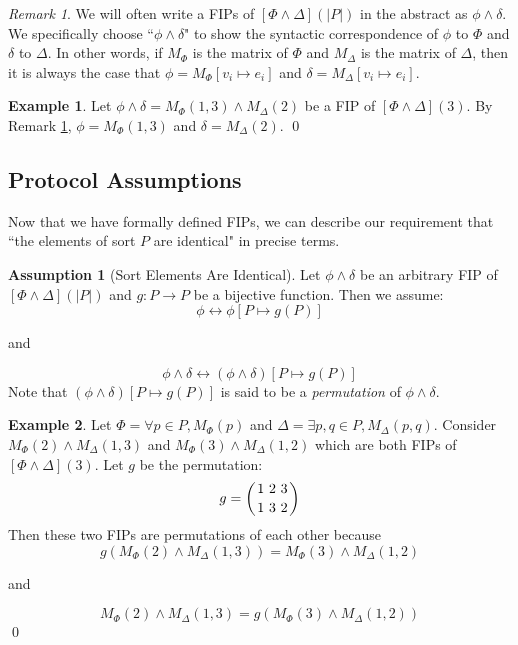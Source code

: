 \documentclass[12pt]{article}
\theoremstyle{definition}
\newtheorem{assumption}{Assumption}
\newtheorem{example}{Example}
\theoremstyle{remark}
\newtheorem{remark}{Remark}
\newcommand{\msp}{\text{ }}
\newcommand{\perm}{\genfrac{}{}{0pt}{}}
\begin{document}
\begin{remark}
  \label{rmk:fip-syntax}
  We will often write a FIPs of $[\Phi\land\Delta](|P|)$ in the abstract as $\phi\land\delta$.  We specifically choose ``$\phi\land\delta$" to show the syntactic correspondence of $\phi$ to $\Phi$ and $\delta$ to $\Delta$.  In other words, if $M_{\Phi}$ is the matrix of $\Phi$ and $M_{\Delta}$ is the matrix of $\Delta$, then it is always the case that $\phi = M_{\Phi}[v_i \mapsto e_i]$ and $\delta = M_{\Delta}[v_i \mapsto e_i]$.
\end{remark}

\begin{example}
  Let $\phi\land\delta = M_{\Phi}(1,3) \land M_{\Delta}(2)$ be a FIP of $[\Phi\land\Delta](3)$.  By Remark \ref{rmk:fip-syntax}, $\phi = M_{\Phi}(1,3)$ and $\delta = M_{\Delta}(2)$.
  \qed
\end{example}


\subsection{Protocol Assumptions}

Now that we have formally defined FIPs, we can describe our requirement that ``the elements of sort $P$ are identical" in precise terms.

\begin{assumption}[Sort Elements Are Identical]
  \label{asmp:perm}
  Let $\phi\land\delta$ be an arbitrary FIP of $[\Phi\land\Delta](|P|)$ and $g : P \to P$ be a bijective function.  Then we assume:
  $$\phi \leftrightarrow \phi[P \mapsto g(P)]$$
  \begin{center}
    and
  \end{center}
  $$\phi\land\delta \leftrightarrow (\phi\land\delta)[P \mapsto g(P)]$$
  Note that $(\phi\land\delta)[P \mapsto g(P)]$ is said to be a \textit{permutation} of $\phi\land\delta$.
\end{assumption}

\begin{example}
  Let $\Phi = \forall p \in P, M_{\Phi}(p)$ and $\Delta = \exists p,q \in P, M_{\Delta}(p,q)$.  Consider $M_{\Phi}(2) \land M_{\Delta}(1,3)$ and $M_{\Phi}(3) \land M_{\Delta}(1,2)$ which are both FIPs of $[\Phi\land\Delta](3)$.  Let $g$ be the permutation:
  $$g = \left(\perm{1 \msp 2 \msp 3}{1 \msp 3 \msp 2}\right)$$
  Then these two FIPs are permutations of each other because
  $$g(M_{\Phi}(2) \land M_{\Delta}(1,3)) = M_{\Phi}(3) \land M_{\Delta}(1,2)$$
  \begin{center}
    and
  \end{center}
  $$M_{\Phi}(2) \land M_{\Delta}(1,3) = g(M_{\Phi}(3) \land M_{\Delta}(1,2))$$
  \qed
\end{example}
\end{document}
